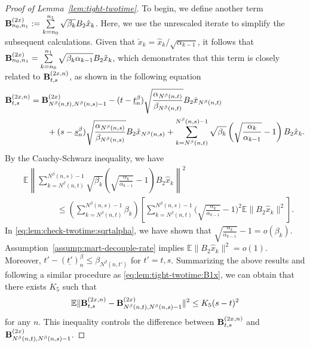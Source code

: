 \documentclass[11pt]{article}
\theoremstyle{plain}
\theoremstyle{definition}
\def\EB{{\mathbb E}}
\newcommand{\xhat}{{\hat{x}}}
\newcommand{\xcheck}{{\check{x}}}
\newcommand{\ssum}[3]{\sum\limits_{{#1}={#2}}^{#3}}
\def\bfB{{\bf B}}
\begin{document}
\begin{appendix}
\begin{proof}[Proof of Lemma~\ref{lem:tight-twotime}]
To begin, we define another term 
    $\bfB^{(2x)}_{n_0,n_1}
    := \ssum{k}{n_0}{n_1} \sqrt{\beta_{k}} B_2 \xhat_{k}$.
    Here, we use the unrescaled iterate to simplify the subsequent calculations. Given that $\xcheck_{k} = \xhat_{k} / \sqrt{\alpha_{k-1} }$, it follows that
    $\bfB^{(2x)}_{n_0,n_1} = \ssum{k}{n_0}{n_1} \sqrt{ \beta_{k} \alpha_{k-1} } B_2 \xcheck_{k}
    $, which demonstrates that this term is closely related to $\bfB^{(2x,n)}_{t,s}$, as shown in the following equation
    \begin{align*}
        \bfB^{(2x,n)}_{t,s} 
        & = \bfB^{(2x)}_{N^\beta(n,t), N^\beta(n,s)-1}
        - (t - \underline{t}^\beta_{n}) \sqrt{ \frac{ \alpha_{N^\beta(n,t)} }{ \beta_{N^\beta(n,t)} } } B_2 \xcheck_{N^\beta(n,t)} \\
        & \qquad  + (s - \underline{s}^\beta_{n})
        \sqrt{ \frac{ \alpha_{N^\beta(n,s)} }{ \beta_{N^\beta(n,s)} } } B_2 \xcheck_{N^\beta(n,s)} 
        + \ssum{k}{N^\beta(n,t)}{N^\beta(n,s)-1} \sqrt{\beta_{k}} \left( \sqrt{ \frac{\alpha_{k}}{\alpha_{k-1}} } - 1 \right) B_2 \xhat_{k}.
    \end{align*}
    By the Cauchy-Schwarz inequality, we have
    \begin{align*}
        & \EB \left\| \ssum{k}{N^\beta(n,t)}{N^\beta(n,s)-1} \sqrt{\beta_{k}} \left( \sqrt{ \frac{\alpha_{k}}{\alpha_{k-1}} } - 1 \right) B_2 \xhat_{k} \right\|^2 \\
        & \qquad \qquad \le \left( \ssum{k}{N^\beta(n,t)}{N^\beta(n,s)-1} \beta_{k} \right) \left[ \ssum{k}  {N^\beta(n,t)}{N^\beta(n,s)-1}  \Big( \sqrt{ \frac{\alpha_{k}}{\alpha_{k-1}} } - 1 \Big)^2  \EB \| B_2 \xhat_{k} \|^2 \right].
    \end{align*}
    In \eqref{eq:lem:check-twotime:sqrtalpha}, we have shown that $\sqrt{ \frac{\alpha_{k}}{\alpha_{k-1}} } - 1 = o(\beta_k)$.
    Assumption~\ref{assump:mart-decouple-rate} implies $\EB \| B_2 \xhat_{k} \|^2 = o(1)$.
    Moreover,
    $t' - (\underline{t'})^\beta_{n} \le \beta_{N^\beta(n,t')}$ for $t'=t,s$.
    Summarizing the above results and following a similar procedure as \eqref{eq:lem:tight-twotime:B1x}, we can obtain that there exists $K_5$ such that
    \begin{align}\label{eq:lem:tight-slow:Bdiff}
        \EB \| \bfB^{(2x,n)}_{t,s} - \bfB^{(2x)}_{N^\beta(n,t), N^\beta(n,s)-1} \|^2
        \le K_5 (s-t)^2
    \end{align}
    for any $n$.
    This inequality controls the difference between $\bfB^{(2x,n)}_{t,s}$ and 
    $\bfB^{(2x)}_{N^\beta(n,t), N^\beta(n,s)-1}$.
    \vspace{0.2cm}
    

\end{proof}
\end{appendix}
\end{document}
